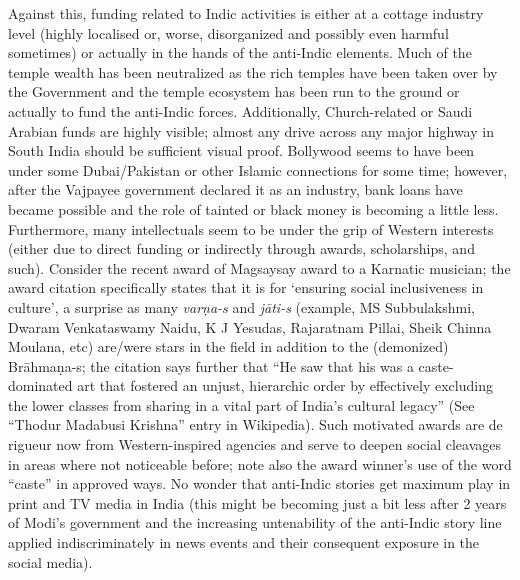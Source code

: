 Against this, funding related to Indic activities is either at a cottage industry level (highly localised or, worse, disorganized and possibly even harmful sometimes) or actually in the hands of the anti-Indic elements. Much of the temple wealth has been neutralized as the rich temples have been taken over by the Government and the temple ecosystem has been run to the ground or actually to fund the anti-Indic forces. Additionally, Church-related or Saudi Arabian funds are highly visible; almost any drive across any major highway in South India should be sufficient visual proof.  Bollywood seems to have been under some Dubai/Pakistan or other Islamic connections for some time; however, after the Vajpayee government declared it as an industry, bank loans have became possible and the role of tainted or black money is becoming a little less.  Furthermore, many intellectuals seem to be under the grip of Western interests (either due to direct funding or indirectly through awards, scholarships, and such). Consider the recent award of Magsaysay award to a Karnatic musician; the award citation specifically states that it is for ‘ensuring social inclusiveness in culture’, a surprise as many {\sl varṇa-s} and \hbox{{\sl jāti-s}} (example, MS Subbulakshmi, Dwaram Venkataswamy Naidu, K J Yesudas, Rajaratnam Pillai, Sheik Chinna Moulana, etc) are/were stars in the field in addition to the (demonized) Brāhmaṇa-s; the citation says further that “He saw that his was a caste-dominated art that fostered an unjust, hierarchic order by effectively excluding the lower classes from sharing in a vital part of India’s cultural legacy” (See “Thodur Madabusi Krishna” entry in Wikipedia). Such motivated awards are de rigueur now from Western-inspired agencies and serve to deepen social cleavages in areas where not noticeable before; note also the award winner’s use of the word “caste” in approved ways. No wonder that anti-Indic stories get maximum play in print and TV media in India (this might be becoming just a bit less after 2 years of Modi’s government and the increasing untenability of the anti-Indic story line applied indiscriminately in news events and their consequent exposure in the social media).

